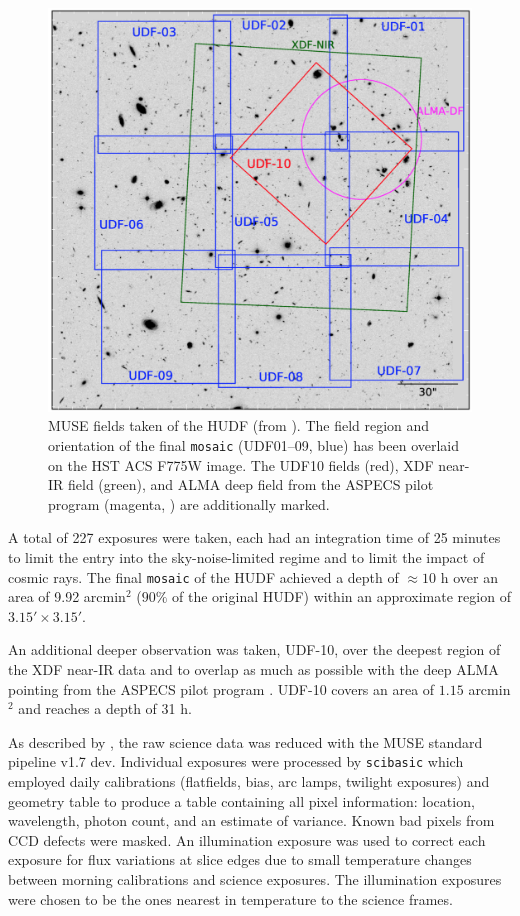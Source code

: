\documentclass[12pt, twocolumn, nofootinbib]{revtex4-1}    %
\begin{document}
\begin{figure}
\includegraphics[width=\linewidth]{introduction/muse_frame}
\caption[MUSE HUDF]{MUSE fields taken of the HUDF (from \cite{2017A&A...608A...1B}). The field region and orientation of the final \texttt{mosaic} (UDF01--09, blue) has been overlaid on the HST ACS F775W image. The UDF10 fields (red), XDF near-IR field (green), and ALMA deep field from the ASPECS pilot program (magenta, \citealt{2016ApJ...833...67W}) are additionally marked.}
\label{fig:muse_frame}
\end{figure}

A total of 227 exposures were taken, each had an integration time of 25 minutes to limit the entry into the sky-noise-limited regime and to limit the impact of cosmic rays. The final \texttt{mosaic} of the HUDF achieved a depth of $\approx10$ h over an area of 9.92 arcmin$^2$ ($90\%$ of the original HUDF) within an approximate region of $3.15'\times3.15'$. 

An additional deeper observation was taken, UDF-10, over the deepest region of the XDF near-IR data and to overlap as much as possible with the deep ALMA pointing from the ASPECS pilot program \citep{2016ApJ...833...67W}. UDF-10 covers an area of $1.15$ arcmin$^2$ and reaches a depth of 31 h.

As described by \cite{2017A&A...608A...1B}, the raw science data was reduced with the MUSE standard pipeline v1.7 dev. Individual exposures were processed by \texttt{scibasic} which employed daily calibrations (flatfields, bias, arc lamps, twilight exposures) and geometry table to produce a table containing all pixel information: location, wavelength, photon count, and an estimate of variance. Known bad pixels from CCD defects were masked. An illumination exposure was used to correct each exposure for flux variations at slice edges due to small temperature changes between morning calibrations and science exposures. The illumination exposures were chosen to be the ones nearest in temperature to the science frames.
\end{document}
